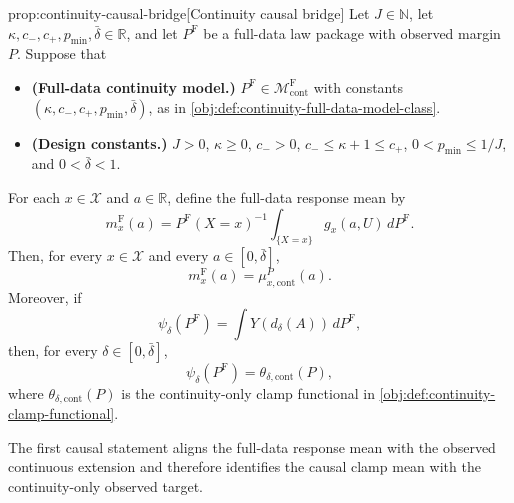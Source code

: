\begin{propositionv}{prop:continuity-causal-bridge}[Continuity causal bridge]
Let \(J\in\mathbb N\), let \(\kappa,c_-,c_+,p_{\min},\bar\delta\in\mathbb R\), and let \(P^{\mathrm F}\) be a full-data law package with observed margin \(P\).  Suppose that
\begin{itemize}
\item \textbf{(Full-data continuity model.)} \(P^{\mathrm F}\in\mathcal M_{\mathrm{cont}}^{\mathrm F}\) with constants \((\kappa,c_-,c_+,p_{\min},\bar\delta)\), as in \cref{obj:def:continuity-full-data-model-class}.
\item \textbf{(Design constants.)} \(J>0\), \(\kappa\geq0\), \(c_->0\), \(c_-\leq \kappa+1\leq c_+\), \(0<p_{\min}\leq 1/J\), and \(0<\bar\delta<1\).
\end{itemize}
For each \(x\in\mathcal X\) and \(a\in\mathbb R\), define the full-data response mean by
\[
m_x^{\mathrm F}(a)
=
P^{\mathrm F}(X=x)^{-1}
\int_{\{X=x\}} g_x(a,U)\,dP^{\mathrm F}.
\]
Then, for every \(x\in\mathcal X\) and every \(a\in[0,\bar\delta]\),
\[
m_x^{\mathrm F}(a)=\mu_{x,\mathrm{cont}}^P(a).
\]
Moreover, if
\[
\psi_\delta(P^{\mathrm F})
=
\int Y\!\left(d_\delta(A)\right)\,dP^{\mathrm F},
\]
then, for every \(\delta\in[0,\bar\delta]\),
\[
\psi_\delta(P^{\mathrm F})
=
\theta_{\delta,\mathrm{cont}}(P),
\]
where \(\theta_{\delta,\mathrm{cont}}(P)\) is the continuity-only clamp functional in \cref{obj:def:continuity-clamp-functional}.
\end{propositionv}

The first causal statement aligns the full-data response mean with the observed continuous extension and therefore identifies the causal clamp mean with the continuity-only observed target.

